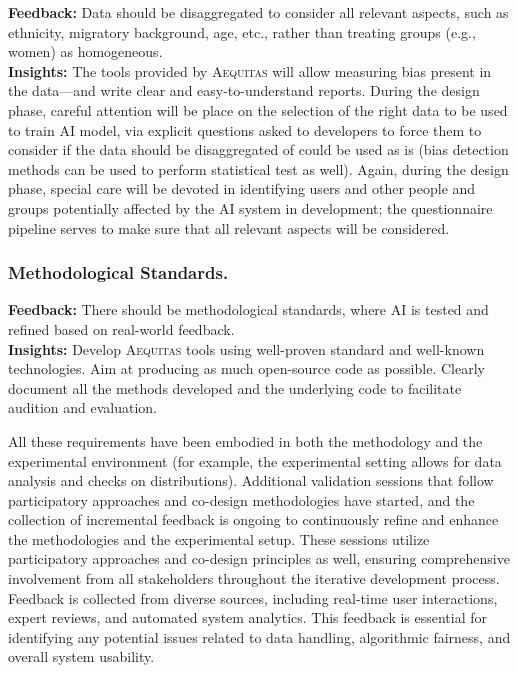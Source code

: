 \documentclass[12pt,a4paper,openright,twoside]{book}
\newcommand{\aequitas}{\textsc{Aequitas}}
\begin{document}
\textbf{Feedback:} Data should be disaggregated to consider all relevant aspects, such as ethnicity, migratory background, age, etc., rather than treating groups (e.g., women) as homogeneous.
\\
\textbf{Insights:} The tools provided by \aequitas{} will allow measuring bias present in the data---and write clear and easy-to-understand reports.
%
During the design phase, careful attention will be place on the selection of the right data to be used to train AI model, via explicit questions asked to developers to force them to consider if the data should be disaggregated of could be used as is (bias detection methods can be used to perform statistical test as well).
%
Again, during the design phase, special care will be devoted in identifying users and other people and groups potentially affected by the AI system in development; the questionnaire pipeline serves to make sure that all relevant aspects will be considered.

\subsubsection{Methodological Standards.}

\textbf{Feedback:} There should be methodological standards, where AI is tested and refined based on real-world feedback.
\\
\textbf{Insights:} Develop \aequitas{} tools using well-proven standard and well-known technologies.
%
Aim at producing as much open-source code as possible.
%
Clearly document all the methods developed and the underlying code to facilitate audition and evaluation.

\vspace{2em}
\noindent
All these requirements have been embodied in both the methodology and the experimental environment (for example, the experimental setting allows for data analysis and checks on distributions).
%
Additional validation sessions that follow participatory approaches and co-design methodologies have started, and the collection of incremental feedback is ongoing to continuously refine and enhance the methodologies and the experimental setup.
%
These sessions utilize participatory approaches and co-design principles as well, ensuring comprehensive involvement from all stakeholders throughout the iterative development process.
%
Feedback is collected from diverse sources, including real-time user interactions, expert reviews, and automated system analytics.
%
This feedback is essential for identifying any potential issues related to data handling, algorithmic fairness, and overall system usability.
\end{document}
